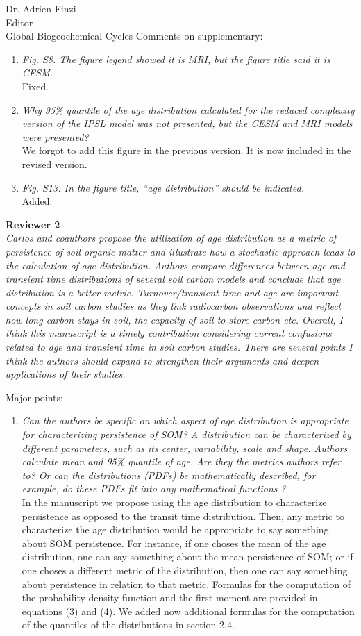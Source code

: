 \documentclass[11pt]{bgcletter}
\begin{document}
\begin{letter}{Dr. Adrien Finzi\\
 Editor \\ Global Biogeochemical Cycles}
Comments on supplementary:
\begin{enumerate}
\item {\it Fig. S8. The figure legend showed it is MRI, but the figure title said it is CESM.} \\
	{\color{blue} Fixed.}
\item {\it Why 95\% quantile of the age distribution calculated for the reduced complexity version
of the IPSL model was not presented, but the CESM and MRI models were presented?} \\
	{\color{blue} We forgot to add this figure in the previous version. It is now included in the revised version.}
\item {\it Fig. S13. In the figure title, ``age distribution'' should be indicated.} \\
	{\color{blue} Added. }
\end{enumerate}

{\bf Reviewer 2} \\
{\it Carlos and coauthors propose the utilization of age distribution as a metric of persistence of soil organic matter and illustrate how a stochastic approach leads to the calculation of age distribution. Authors compare differences between age and transient time distributions of several soil carbon models and conclude that age distribution is a better metric. Turnover/transient time and age are important concepts in soil carbon studies as they link radiocarbon observations and reflect how long carbon stays in soil, the capacity of soil to store carbon etc. Overall, I think this manuscript is a timely contribution considering current confusions related to age and transient time in soil carbon studies. There are several points I think the authors should expand to strengthen their arguments and deepen applications of their studies. }

Major points:
\begin{enumerate}
\item  {\it Can the authors be specific on which aspect of age distribution is appropriate for characterizing persistence of SOM? A distribution can be characterized by different parameters, such as its center, variability, scale and shape. Authors calculate mean and 95\% quantile of age. Are they the metrics authors refer to? Or can the distributions (PDFs) be mathematically described, for example, do these PDFs fit into any mathematical functions ? } \\
	{\color{blue} In the manuscript we propose using the age distribution to characterize persistence as opposed to the transit time distribution. Then, any metric to characterize the age distribution would be appropriate to say something about SOM persistence. For instance, if one choses the mean of the age distribution, one can say something about the mean persistence of SOM; or if one choses a different metric  of the distribution, then one can say something about persistence in relation to that metric. Formulas for the computation of the probability density function and the first moment are provided in equations (3) and (4). We added now additional formulas for the computation of the quantiles of the distributions in section 2.4. }


\end{enumerate}
\end{letter}
\end{document}
